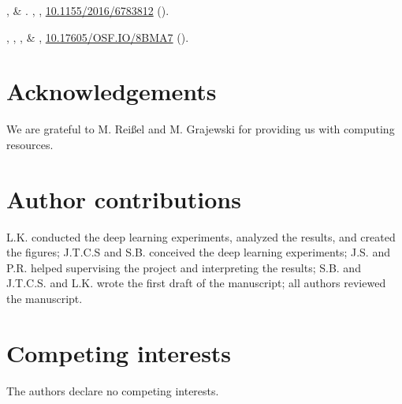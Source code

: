 \documentclass[fleqn,twocolumn,10pt]{wlscirep}
\begin{document}
\begin{thebibliography}{10}
  ,
     \& 
  \newblock {}.
    \textbf{}, ,
    \doiprefix\href{http://doi.org/10.1155/2016/6783812}{10.1155/2016/6783812}
    ().
  
  , ,
    ,  \&
  \newblock {},
    \doiprefix\href{http://doi.org/10.17605/OSF.IO/8BMA7}{10.17605/OSF.IO/8BMA7}
    ().
  
  \end{thebibliography}
  

\section*{Acknowledgements}

We are grateful to M. Reißel and M. Grajewski for providing us with computing
resources.

\section*{Author contributions}

L.K. conducted the deep learning experiments, analyzed the results, and created
the figures; J.T.C.S and S.B. conceived the deep learning experiments; J.S. and
P.R. helped supervising the project and interpreting the results; S.B. and
J.T.C.S. and L.K. wrote the first draft of the manuscript; all authors reviewed
the manuscript.

\section*{Competing interests}

The authors declare no competing interests.
\end{document}

